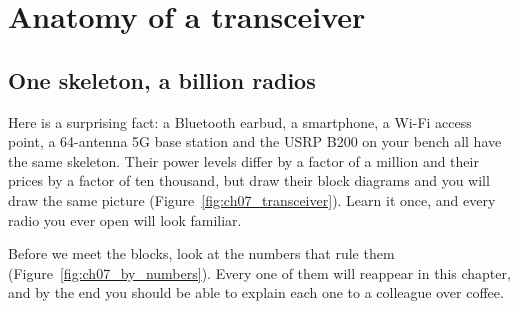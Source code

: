 \section{Anatomy of a transceiver}
\label{sec:ch07:anatomy}

\subsection{One skeleton, a billion radios}

Here is a surprising fact: a Bluetooth earbud, a smartphone, a Wi-Fi access point, a 64-antenna
5G base station and the USRP B200 on your bench all have the same skeleton. Their power levels differ
by a factor of a million and their prices by a factor of ten thousand, but draw their block diagrams
and you will draw the same picture (Figure~\ref{fig:ch07_transceiver}). Learn it once, and every radio
you ever open will look familiar.

Before we meet the blocks, look at the numbers that rule them (Figure~\ref{fig:ch07_by_numbers}).
Every one of them will reappear in this chapter, and by the end you should be able to explain each
one to a colleague over coffee.



